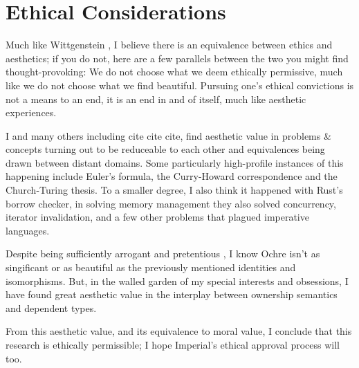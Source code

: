 \documentclass[12pt,twoside]{report}
\begin{document}
\newpage
\section*{Ethical Considerations}
Much like Wittgenstein \citep[proposition 6.421]{wittgensteinTractatusLogicophilosophicus1922}, I believe there is an equivalence between ethics and aesthetics; if you do not, here are a few parallels between the two you might find thought-provoking: We do not choose what we deem ethically permissive, much like we do not choose what we find beautiful. Pursuing one's ethical convictions is not a means to an end, it is an end in and of itself, much like aesthetic experiences.

I and many others including cite cite cite, find aesthetic value in problems \& concepts turning out to be reduceable to each other and equivalences being drawn between distant domains. Some particularly high-profile instances of this happening include Euler's formula, the Curry-Howard correspondence and the Church-Turing thesis. To a smaller degree, I also think it happened with Rust's borrow checker, in solving memory management they also solved concurrency, iterator invalidation, and a few other problems that plagued imperative languages.

Despite being sufficiently arrogant and pretentious \cite[Ethical Considerations]{lidburyOchreDependentlyTyped2024}, I know Ochre isn't as singificant or as beautiful as the previously mentioned identities and isomorphisms. But, in the walled garden of my special interests and obsessions, I have found great aesthetic value in the interplay between ownership semantics and dependent types.

From this aesthetic value, and its equivalence to moral value, I conclude that this research is ethically permissible; I hope Imperial's ethical approval process will too.

\clearpage{\pagestyle{empty}\cleardoublepage}

{\small
\begingroup
\setlength{\parskip}{0pt} %
\setlength{\parindent}{0pt} %
\renewcommand{\baselinestretch}{0.9} %
\tableofcontents
\endgroup
}


\setcounter{page}{1}
\fancyhead[LE,RO]{\slshape \rightmark}
\fancyhead[LO,RE]{\slshape \leftmark}
\end{document}
